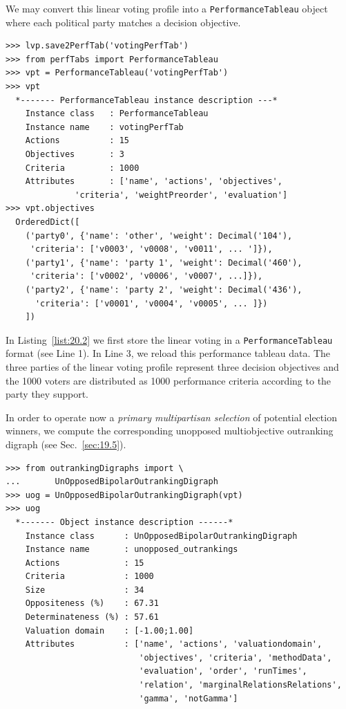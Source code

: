 We may convert this linear voting profile into a \texttt{PerformanceTableau} object where each political party matches a decision objective.
\begin{lstlisting}[caption={Converting a voting profile into a performance tableau},label=list:20.2]
>>> lvp.save2PerfTab('votingPerfTab')
>>> from perfTabs import PerformanceTableau
>>> vpt = PerformanceTableau('votingPerfTab')
>>> vpt
  *------- PerformanceTableau instance description ---*
    Instance class   : PerformanceTableau
    Instance name    : votingPerfTab
    Actions          : 15
    Objectives       : 3
    Criteria         : 1000
    Attributes       : ['name', 'actions', 'objectives',
              'criteria', 'weightPreorder', 'evaluation']
>>> vpt.objectives
  OrderedDict([
    ('party0', {'name': 'other', 'weight': Decimal('104'),
     'criteria': ['v0003', 'v0008', 'v0011', ... ']}),
    ('party1', {'name': 'party 1', 'weight': Decimal('460'),
     'criteria': ['v0002', 'v0006', 'v0007', ...]}),
    ('party2', {'name': 'party 2', 'weight': Decimal('436'),
      'criteria': ['v0001', 'v0004', 'v0005', ... ]})
    ])
\end{lstlisting}

In Listing~\vref{list:20.2} we first store the linear voting in a \texttt{PerformanceTableau} format (see Line 1). In Line 3, we reload this performance tableau data. The three parties of the linear voting profile represent three decision objectives and the 1000 voters are distributed as 1000 performance criteria according to the party they support.


In order to operate now a \emph{primary multipartisan selection} of potential election winners, we compute the corresponding unopposed multiobjective outranking digraph (see Sec.~\ref{sec:19.5}).
\begin{lstlisting}[caption={Computing unopposed multiobjective outranking situations},label=list:20.3]
>>> from outrankingDigraphs import \
...       UnOpposedBipolarOutrankingDigraph
>>> uog = UnOpposedBipolarOutrankingDigraph(vpt)
>>> uog
  *------- Object instance description ------*
    Instance class      : UnOpposedBipolarOutrankingDigraph
    Instance name       : unopposed_outrankings
    Actions             : 15
    Criteria            : 1000
    Size                : 34
    Oppositeness (%)    : 67.31
    Determinateness (%) : 57.61
    Valuation domain    : [-1.00;1.00]
    Attributes          : ['name', 'actions', 'valuationdomain',
                           'objectives', 'criteria', 'methodData',
                           'evaluation', 'order', 'runTimes',
                           'relation', 'marginalRelationsRelations',
                           'gamma', 'notGamma']
\end{lstlisting}

